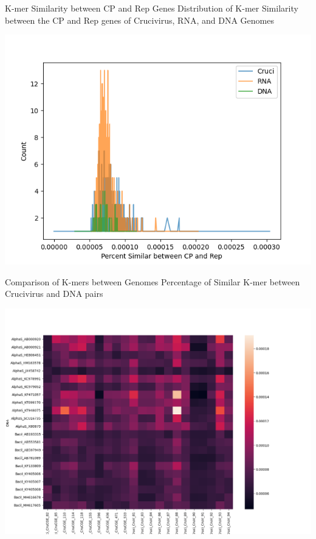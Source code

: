 \documentclass{beamer}
\begin{document}
\begin{frame}{K-mer Similarity between CP and Rep Genes}
    \centering
    Distribution of K-mer Similarity between the CP and Rep genes of Crucivirus, RNA, and DNA Genomes
    
    \includegraphics[scale = 0.5]{KmerSimilarityCpRep.png}
\end{frame}

\begin{frame}{Comparison of K-mers between Genomes}
    \centering
    Percentage of Similar K-mer between Crucivirus and DNA pairs

    \includegraphics[scale = 0.25]{ComparisonBetweenDNAandCruci.png}
\end{frame}
\end{document}
